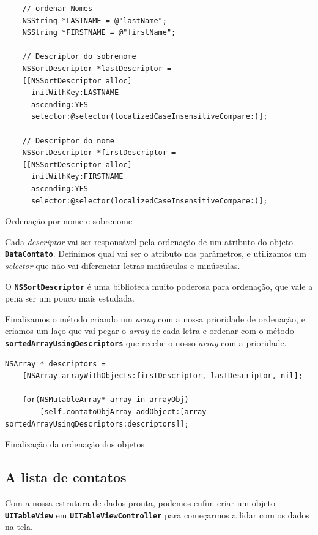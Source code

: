 \documentclass[a4paper,12pt,brazil,doubleside]{book}
\begin{document}
\begin{singlespace}
\begin{listing}[H]
\begin{verbatim}
    // ordenar Nomes
    NSString *LASTNAME = @"lastName";
    NSString *FIRSTNAME = @"firstName";
    
    // Descriptor do sobrenome
    NSSortDescriptor *lastDescriptor =
    [[NSSortDescriptor alloc]
      initWithKey:LASTNAME
      ascending:YES
      selector:@selector(localizedCaseInsensitiveCompare:)];
    
    // Descriptor do nome
    NSSortDescriptor *firstDescriptor =
    [[NSSortDescriptor alloc]
      initWithKey:FIRSTNAME
      ascending:YES
      selector:@selector(localizedCaseInsensitiveCompare:)];
\end{verbatim}
\caption{Ordenação por nome e sobrenome}
\end{listing}


Cada \emph{descriptor} vai ser responsável pela ordenação de um atributo do objeto \texttt{\textbf{DataContato}}. Definimos qual vai ser o atributo nos parâmetros, e utilizamos um \emph{selector} que não vai diferenciar letras maiúsculas e minúsculas.

O \texttt{\textbf{NSSortDescriptor}} é uma biblioteca muito poderosa para ordenação, que vale a pena ser um pouco mais estudada.

Finalizamos o método criando um \emph{array} com a nossa prioridade de ordenação, e criamos um laço que vai pegar o \emph{array} de cada letra e ordenar com o método \texttt{\textbf{sortedArrayUsingDescriptors}} que recebe o nosso \emph{array} com a prioridade.

\begin{listing}[H]
\begin{verbatim}
NSArray * descriptors =
    [NSArray arrayWithObjects:firstDescriptor, lastDescriptor, nil];
      
    for(NSMutableArray* array in arrayObj)
        [self.contatoObjArray addObject:[array sortedArrayUsingDescriptors:descriptors]];
\end{verbatim}
\caption{Finalização da ordenação dos objetos}
\end{listing}

\subsection{A lista de contatos}


Com a nossa estrutura de dados pronta, podemos enfim criar um objeto \texttt{\textbf{UITableView}} em \texttt{\textbf{UITableViewController}} para começarmos a lidar com os dados na tela.


\end{singlespace}
\end{document}
